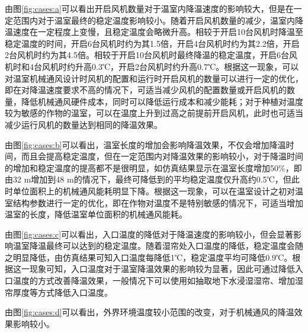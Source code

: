 		\begin{figure}[!htbp]
		\centering
 	\end{figure}
由图\ref{fig:cases:a}可以看出开启风机数量对于温室内降温速度的影响较大，但是在一定范围内对于温室最终的稳定温度影响较小。随着开启风机数量的减少，温室内降温速度在一定程度上变慢，且稳定温度会略微升高。相较于开启10台风机时降温至稳定温度的时间，开启6台风机时约为其1.5倍，开启4台风机时约为其2.2倍，开启2台风机时约为其4.5倍。相较于开启10台风机时最终降温的稳定温度，开启6台风机时和4台风机时约升高0.3℃，开启2台风机时约升高0.7℃。根据这一现象，可以对温室机械通风设计时风机的配置和运行时开启风机的数量可以进行一定的优化，即在对降温速度要求不高的情况下，可适当减少风机的配置数量或开启风机的数量，降低机械通风硬件成本，同时可以降低运行成本和减少能耗；对于种植对温度较为敏感的作物的温室，可以在温度上升到过高之前提前开启风机，此时也可适当减少运行风机的数量达到相同的降温效果。

由图\ref{fig:cases:b}可以看出，温室长度的增加会影响降温效果，不仅会增加降温时间，而且会提高稳定温度，但在一定范围内对降温效果的影响较小，对于降温时间的增加和稳定温度的提高都不是很明显，如仿真结果显示在温室长度增加50\%，即由32 m增加到48 m的情况下，最终可降低到的平均稳定温度仅升高约0.5℃，但此时单位面积上的机械通风能耗明显下降。根据这一现象，可以在温室设计之初对温室结构参数进行一定的优化，即在作物对温度不是特别敏感的情况下，可适当增加温室的长度，降低温室单位面积的机械通风能耗。

由图\ref{fig:cases:c}可以看出，入口温度的降低对于降温速度的影响较小，但会显著影响温室降温最终可以达到的稳定温度。随着湿帘处入口温度的降低，稳定温度会随之明显降低，由仿真结果可知入口温度每降低1℃，稳定温度平均可降低0.9℃。根据这一现象可知，入口温度对于温室降温效果的影响较为显著，因此可通过降低入口温度的方式改善降温效果，一般情况下可以使用如抽取地下水浸湿湿帘、增加湿帘厚度等方式降低入口温度。

由图\ref{fig:cases:d}可以看出，外界环境温度较小范围的改变，对于机械通风的降温效果影响较小。

